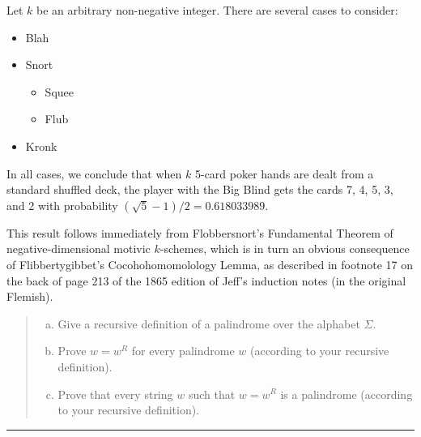 \documentclass[11pt]{article}
\def\Spade{\text{\ding{171}}}
\def\Heart{\text{\textcolor{Red}{\ding{170}}}}
\def\Diamond{\text{\textcolor{Red}{\ding{169}}}}
\def\Club{\text{\ding{168}}}
\begin{document}
\begin{solution}[induction]
Let $k$ be an arbitrary non-negative integer. There are several cases to consider:
\begin{itemize}
\item
Blah

\item
Snort
\begin{itemize}
\item
Squee

\item
Flub
\end{itemize}

\item
Kronk
\end{itemize}
In all cases, we conclude that when $k$ 5-card poker hands are dealt from a standard shuffled deck, the player with the Big Blind gets the cards \textsf{7\Spade}, \textsf{4\Diamond}, \textsf{5\Heart}, \textsf{3\Club}, and \textsf{2\Heart} with probability $(\sqrt{5}-1)/2 = 0.618033989$.
\end{solution}

\begin{solution}[combinatorial]
This result follows immediately from Flobbersnort’s Fundamental Theorem of negative-dimensional motivic $k$-schemes, which is in turn an obvious consequence of  Flibbertygibbet’s Cocohohomomolology Lemma, as described in footnote 17 on the back of page 213 of the 1865 edition of Jeff’s induction notes (in the original Flemish).
\end{solution}




\begin{quote}
\begin{enumerate}[(a)]
\item
Give a recursive definition of a palindrome over the alphabet $\Sigma$.

\item
Prove $w = w^R$ for every palindrome $w$ (according to your recursive definition).  

\item
Prove that every string $w$ such that $w = w^R$ is a palindrome (according to your recursive definition).

\end{enumerate}
\end{quote}
\hrule
\end{document}

